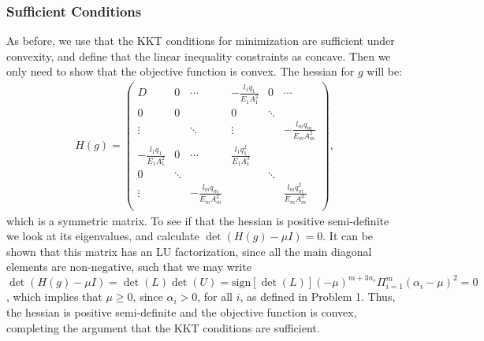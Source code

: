 \documentclass[10pt,a4paper]{article}
\begin{document}
\subsubsection{Sufficient Conditions}
As before, we use that the KKT conditions for minimization are sufficient under convexity, and define that the linear inequality constraints as concave. Then we only need to show that the objective function is convex. 
The hessian for $g$ will be:
\begin{align}
H(g) = 
\begin{pmatrix}
D & 0 & \cdots & -\frac{l_1 q_1}{E_1 A_1^2} &0 &\cdots \\
0 & 0 &  & 0& \ddots & \\
\vdots &  & \ddots &\vdots  &  & -\frac{l_m q_m}{E_m A_m^2} \\
-\frac{l_1 q_1}{E_1 A_1^2} & 0 & \cdots & \frac{l_1 q_1^2}{E_1 A_1^3} \\
0 & \ddots& & & \ddots\\
\vdots & & -\frac{l_m q_m}{E_m A_m^2}&& & \frac{l_m q_m^2}{E_m A_m^3} \\
\end{pmatrix},
\end{align}
which is a symmetric matrix. To see if that the hessian is positive semi-definite we look at its eigenvalues, and calculate $\det(H(g)-\mu I)=0$. It can be shown that this matrix has an LU factorization, since all the main diagonal elements are non-negative, such that we may write $\det(H(g)-\mu I) = \det(L)\det(U) = \text{sign}[\det(L)](-\mu)^{m+3n_s}\Pi_{i=1}^m(\alpha_i-\mu)^2 = 0$, which implies that $\mu \geq 0$, since $\alpha_i > 0$, for all $i$, as defined in Problem 1. Thus, the hessian is positive semi-definite and the objective function is convex, completing the argument that the KKT conditions are sufficient.
\end{document}
